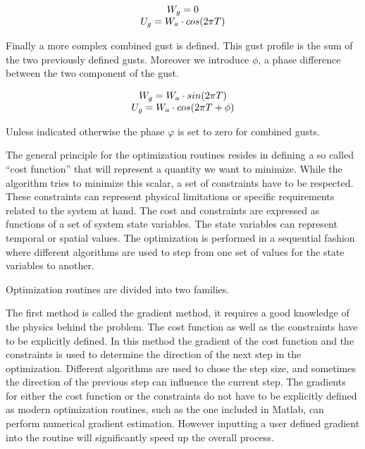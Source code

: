 \begin{equation}
\begin{array}[c]{c}
  W_g = 0 \\
  U_g = W_a \cdot cos(2 \pi T)
\end{array}
\label{eqn:horizontal_gust_definition}
\end{equation}

\par Finally a more complex combined gust is defined.
This gust profile is the sum of the two previously defined gusts.
Moreover we introduce $\phi$, a phase difference between the two component of the gust. 

\begin{equation}
\begin{array}[c]{c}
  W_g = W_a \cdot sin(2\pi T) \\
  U_g = W_a \cdot cos(2 \pi T + \phi)
\end{array}
\label{eqn:combined_gust_definition}
\end{equation}

Unless indicated otherwise the phase $\varphi$ is set to zero for combined gusts.


The general principle for the optimization routines resides in defining a so called ``cost function'' that will represent a quantity we want to minimize.
While the algorithm tries to minimize this scalar, a set of constraints have to be respected. 
These constraints can represent physical limitations or specific requirements related to the system at hand.
The cost and constraints are expressed as functions of a set of system state variables.
The state variables can represent temporal or spatial values.
The optimization is performed in a sequential fashion where different algorithms are used to step from one set of values for the state variables to another. 

\par Optimization routines are divided into two families. 

\par The first method is called the gradient method, it requires a good knowledge of the physics behind the problem.
The cost function as well as the constraints have to be explicitly defined.
In this method the gradient of the cost function and the constraints is used to determine the direction of the next step in the optimization.
Different algorithms are used to chose the step size, and sometimes the direction of the previous step can influence the current step.
The gradients for either the cost function or the constraints do not have to be explicitly defined as modern optimization routines, such as the one included in Matlab, can perform numerical gradient estimation.
However inputting a user defined gradient into the routine will significantly speed up the overall process.

